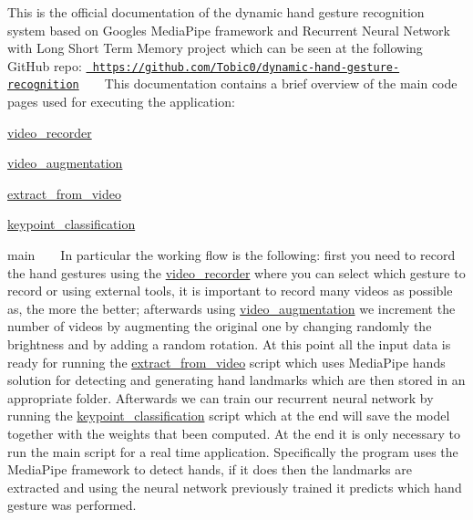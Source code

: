 This is the official documentation of the dynamic hand gesture recognition system based on Google\textquotesingle{}s Media\+Pipe framework and Recurrent Neural Network with Long Short Term Memory project which can be seen at the following Git\+Hub repo\+: \href{https://github.com/Tobic0/dynamic-hand-gesture-recognition}{\texttt{ https\+://github.\+com/\+Tobic0/dynamic-\/hand-\/gesture-\/recognition}} ~\newline
~\newline
 This documentation contains a brief overview of the main code pages used for executing the application\+:
\begin{DoxyItemize}
\item \mbox{\hyperlink{namespacevideo__recorder}{video\+\_\+recorder}}
\item \mbox{\hyperlink{namespacevideo__augmentation}{video\+\_\+augmentation}}
\item \mbox{\hyperlink{namespaceextract__from__video}{extract\+\_\+from\+\_\+video}}
\item \mbox{\hyperlink{namespacekeypoint__classification}{keypoint\+\_\+classification}}
\item main ~\newline
~\newline
 In particular the working flow is the following\+: first you need to record the hand gestures using the \mbox{\hyperlink{namespacevideo__recorder}{video\+\_\+recorder}} where you can select which gesture to record or using external tools, it is important to record many videos as possible as, the more the better; afterwards using \mbox{\hyperlink{namespacevideo__augmentation}{video\+\_\+augmentation}} we increment the number of videos by augmenting the original one by changing randomly the brightness and by adding a random rotation. At this point all the input data is ready for running the \mbox{\hyperlink{namespaceextract__from__video}{extract\+\_\+from\+\_\+video}} script which uses Media\+Pipe hands solution for detecting and generating hand landmarks which are then stored in an appropriate folder. Afterwards we can train our recurrent neural network by running the \mbox{\hyperlink{namespacekeypoint__classification}{keypoint\+\_\+classification}} script which at the end will save the model together with the weights that been computed. At the end it is only necessary to run the main script for a real time application. Specifically the program uses the Media\+Pipe framework to detect hands, if it does then the landmarks are extracted and using the neural network previously trained it predicts which hand gesture was performed. 
\end{DoxyItemize}